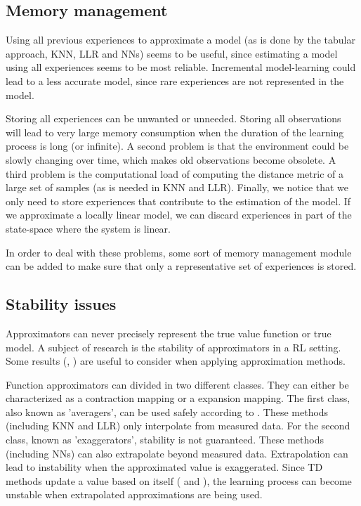 \documentclass[a4paper,11pt]{mscLiterature}
\begin{document}
\subsection{Memory management}
Using all previous experiences to approximate a model (as is done by the tabular approach, KNN, LLR and NNs) seems to be useful, since estimating a model using all experiences seems to be most reliable. Incremental model-learning could lead to a less accurate model, since rare experiences are not represented in the model.

Storing all experiences can be unwanted or unneeded. Storing all observations will lead to very large memory consumption when the duration of the learning process is long (or infinite). A second problem is that the environment could be slowly changing over time, which makes old observations become obsolete. A third problem is the computational load of computing the distance metric of a large set of samples (as is needed in KNN and LLR). Finally, we notice that we only need to store experiences that contribute to the estimation of the model. If we approximate a locally linear model, we can discard experiences in part of the state-space where the system is linear. 

In order to deal with these problems, some sort of memory management module can be added to make sure that only a representative set of experiences is stored.



\subsection{Stability issues}
Approximators can never precisely represent the true value function or true model. A subject of research is the stability of approximators in a RL setting. Some results (\cite{ThrunSchwartz:93}, \cite{Gordon:99}) are useful to consider when applying approximation methods.

Function approximators can divided in two different classes. They can either be characterized as a contraction mapping or a expansion mapping. The first class, also known as 'averagers', can be used safely according to \cite{Gordon:99}. These methods (including KNN and LLR) only interpolate from measured data. For the second class, known as 'exaggerators', stability is not guaranteed. These methods (including NNs) can also extrapolate beyond measured data. Extrapolation can lead to instability when the approximated value is exaggerated. Since TD methods update a value based on itself ( and ), the learning process can become unstable when extrapolated approximations are being used. 
\end{document}
